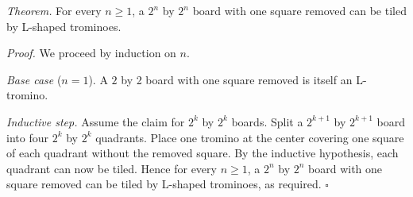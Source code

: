 \textit{Theorem.} For every $n \geq 1$, a $2^{n}$ by $2^{n}$ board with one square removed can be tiled by L-shaped trominoes.

\textit{Proof.} We proceed by induction on $n$.

\textit{Base case} ($n = 1$). A $2$ by 2 board with one square removed is itself an L-tromino.

\textit{Inductive step.} Assume the claim for $2^{k}$ by $2^{k}$ boards.
Split a $2^{k + 1}$ by $2^{k + 1}$ board into four $2^{k}$ by $2^{k}$ quadrants.
Place one tromino at the center covering one square of each quadrant without the removed square.
By the inductive hypothesis, each quadrant can now be tiled.
Hence for every $n \geq 1$, a $2^{n}$ by $2^{n}$ board with one square removed can be tiled by L-shaped trominoes, as required. \hfill$\square$